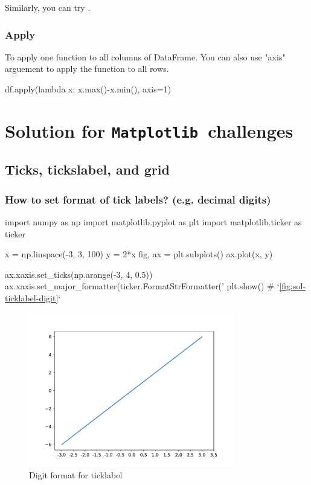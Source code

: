 \documentclass{report}
\newcommand{\mpl}{\texttt{Matplotlib}}
\begin{document}
Similarly, you can try . 

\subsection{Apply}
To apply one function to all columns of DataFrame. You can also use "axis" arguement to apply the function to all rows.
\begin{py}
df.apply(lambda x: x.max()-x.min(), axis=1)
\end{py}

\chapter{Solution for \mpl\ challenges}
\section{Ticks, tickslabel, and grid}
\subsection{How to set format of tick labels? (e.g. decimal digits)}

\begin{py}
import numpy as np
import matplotlib.pyplot as plt
import matplotlib.ticker as ticker

x = np.linspace(-3, 3, 100)
y = 2*x
fig, ax = plt.subplots()
ax.plot(x, y)

ax.xaxis.set_ticks(np.arange(-3, 4, 0.5))
ax.xaxis.set_major_formatter(ticker.FormatStrFormatter('%
plt.show()  # `\autoref{fig:sol-ticklabel-digit}`
\end{py}

\begin{figure}[!htb]
  \centering
  \includegraphics[width=90mm]{sol-ticklabel-digit}
  \caption{Digit format for ticklabel}
  \label{fig:sol-ticklabel-digit}
\end{figure}
\end{document}
